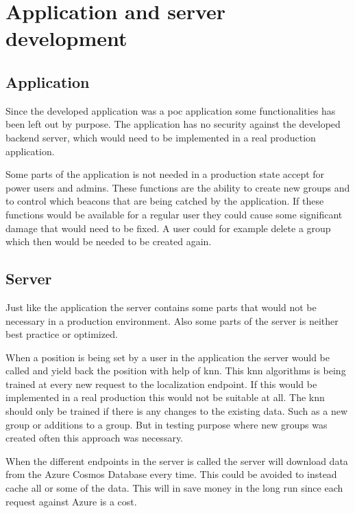 \section{Application and server development}\label{sec:discussionAppDev}
\subsection{Application}\label{sec:}
Since the developed application was a \acrshort{poc} application some functionalities has been left out by purpose.
The application has no security against the developed backend server, which would need to be implemented in a real production application.

\bigskip

Some parts of the application is not needed in a production state accept for power users and admins.
These functions are the ability to create new groups and to control which beacons that are being catched by the application.
If these functions would be available for a regular user they could cause some significant damage that would need to be fixed.
A user could for example delete a group which then would be needed to be created again.

\subsection{Server}\label{sec:}
Just like the application the server contains some parts that would not be necessary in a production environment.
Also some parts of the server is neither best practice or optimized.

\bigskip

When a position is being set by a user in the application the server would be called and yield back the position with help of \acrlong{knn}.
This \acrshort{knn} algorithms is being trained at every new request to the localization endpoint.
If this would be implemented in a real production this would not be suitable at all.
The \acrshort{knn} should only be trained if there is any changes to the existing data.
Such as a new group or additions to a group.
But in testing purpose where new groups was created often this approach was necessary.

\bigskip

When the different endpoints in the server is called the server will download data from the Azure Cosmos Database every time. 
This could be avoided to instead cache all or some of the data.
This will in save money in the long run since each request against Azure is a cost.


